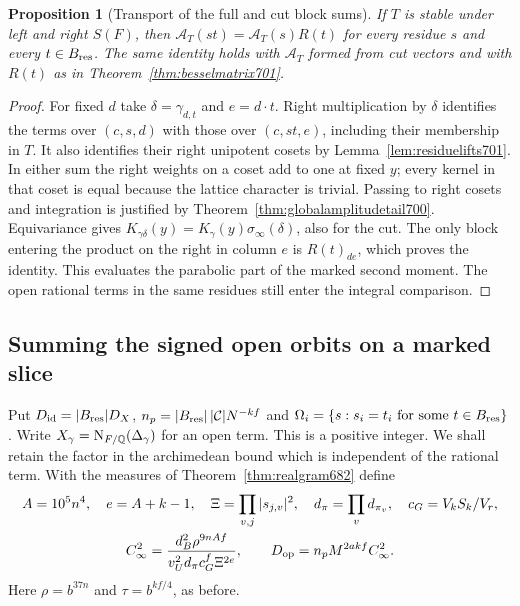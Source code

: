 \documentclass[a4paper,11pt]{article}
\newtheorem{proposition}{Proposition}[section]
\theoremstyle{definition}
\theoremstyle{remark}
\numberwithin{equation}{section}
\begin{document}
\begin{proposition}[Transport of the full and cut block sums]\leavevmode
\label{prop:residuetransport701}
If \(T\) is stable under left and right \(S(F)\), then
\(\mathcal A_T(st)=\mathcal A_T(s)R(t)\) for every residue
\(s\) and every \(t\in B_{\rm res}\). The same identity holds
with \(\mathcal A_T\) formed from cut vectors and with \(R(t)\)
as in Theorem~\ref{thm:besselmatrix701}.
\end{proposition}
\begin{proof}
For fixed \(d\) take \(\delta=\gamma_{d,t}\) and \(e=d\cdot t\).
Right multiplication by \(\delta\) identifies the terms over
\((c,s,d)\) with those over \((c,st,e)\), including their
membership in \(T\). It also identifies their right unipotent
cosets by Lemma~\ref{lem:residuelifts701}. In either sum the
right weights on a coset add to one at fixed \(y\); every
kernel in that coset is equal because the lattice character
is trivial. Passing to right cosets and integration is justified
by Theorem~\ref{thm:globalamplitudetail700}. Equivariance gives
\(K_{\gamma\delta}(y)=K_\gamma(y)\sigma_\infty(\delta)\),
also for the cut. The only block entering the product on the
right in column \(e\) is \(R(t)_{de}\), which proves the
identity. This evaluates the parabolic part of the marked
second moment. The open rational terms in the same residues
still enter the integral comparison.
\end{proof}


\subsection{Summing the signed open orbits on a marked slice}
\label{sec:signedopenslice702}

Put \(D_{\rm id}=|B_{\rm res}|D_X\),
\(n_p=|B_{\rm res}|\,|\mathcal C|N^{-kf}\) and
\(\Omega_i=\{s:s_i=t_i\text{ for some }t\in B_{\rm res}\}\).
Write \(X_\gamma={\rm N}_{F/\mathbb Q}(\Delta_\gamma)\) for an
open term. This is a positive integer. We shall retain the
factor in the archimedean bound which is independent of the
rational term. With the measures of Theorem~\ref{thm:realgram682}
define
\[
 \begin{gathered}
 A=10^5n^4,\quad e=A+k-1,\quad
 \Xi=\prod_{v,j}|s_{j,v}|^2,\quad d_\pi=\prod_v d_{\pi_v},
 \quad c_G=V_k S_k/V_r,\\
 C_\infty^2=
  \frac{d_B^2\rho^{9nAf}}
       {v_U^2d_\pi c_G^f\Xi^{2e}},\qquad
 D_{\rm op}=n_p M^{2akf}C_\infty^2 .
 \end{gathered}
\]
Here \(\rho=b^{37n}\) and \(\tau=b^{kf/4}\), as before.
\end{document}
